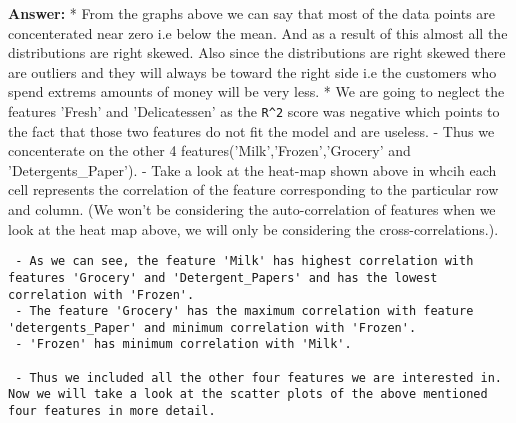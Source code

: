 \documentclass[11pt]{article}
\begin{document}
    \textbf{Answer:} * From the graphs above we can say that most of the
data points are concenterated near zero i.e below the mean. And as a
result of this almost all the distributions are right skewed. Also since
the distributions are right skewed there are outliers and they will
always be toward the right side i.e the customers who spend extrems
amounts of money will be very less. * We are going to neglect the
features 'Fresh' and 'Delicatessen' as the \texttt{R\^{}2} score was
negative which points to the fact that those two features do not fit the
model and are useless. - Thus we concenterate on the other 4
features('Milk','Frozen','Grocery' and 'Detergents\_Paper'). - Take a
look at the heat-map shown above in whcih each cell represents the
correlation of the feature corresponding to the particular row and
column. (We won't be considering the auto-correlation of features when
we look at the heat map above, we will only be considering the
cross-correlations.).

\begin{verbatim}
 - As we can see, the feature 'Milk' has highest correlation with features 'Grocery' and 'Detergent_Papers' and has the lowest correlation with 'Frozen'.
 - The feature 'Grocery' has the maximum correlation with feature 'detergents_Paper' and minimum correlation with 'Frozen'.
 - 'Frozen' has minimum correlation with 'Milk'.
 
 - Thus we included all the other four features we are interested in. Now we will take a look at the scatter plots of the above mentioned four features in more detail.
\end{verbatim}
\end{document}
